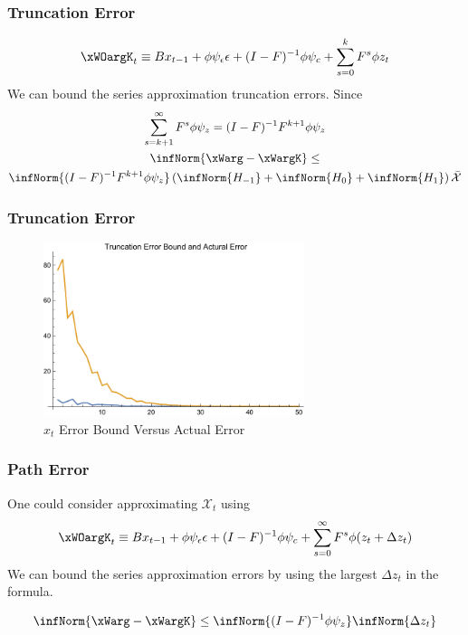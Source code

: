 \documentclass[notheorems]{beamer}
\begin{document}
\begin{frame}
  \frametitle{Truncation Error}
 	 \begin{gather}
 	 \xWOargK_t \equiv B x_{t-1}+ \phi \psi_\epsilon\epsilon  + (I - F)^{-1} \phi \psi_c + \sum_{s=0}^k F^s \phi z_{t}\label{theTruncSeries}
 \end{gather}
We can bound the  series approximation truncation errors.
Since
    \begin{gather}
      \label{eq:1}
\sum_{s=k+1}^{\infty} F^s \phi \psi_z = (I -F)^{-1} F^{k+1}\phi \psi_z       \\
\infNorm{\xWarg-\xWargK} \le\\ \infNorm{(I -F)^{-1} F^{k+1}\phi \psi_z} \left ( \infNorm{H_{-1} }+ \infNorm{H_{0} }+ \infNorm{H_{1} } \right )\bar{\mathcal{X}}
    \end{gather}

\end{frame}
\begin{frame}
  \frametitle{Truncation Error}


\begin{figure}
  \centering


\includegraphics[width=3in]{arbTruncErr.pdf}  
  \caption{$x_t$ Error Bound Versus Actual Error} \label{figArbTrunc}

\end{figure}

\end{frame}

\begin{frame}
  \frametitle{Path Error}
One could consider approximating $\mathcal{X}_t$ using
 	 \begin{gather}
 	 \xWOargK_t \equiv B x_{t-1}+ \phi \psi_\epsilon\epsilon  + (I - F)^{-1} \phi \psi_c + \sum_{s=0}^\infty F^s \phi (z_{t}+\Delta z_{t})\label{theDeltaSeries}
 \end{gather}
We can bound the  series approximation  errors by using the largest $\Delta z_t$ in the formula. 

    \begin{gather}
\infNorm{\xWarg-\xWargK} \le \infNorm{(I -F)^{-1} \phi \psi_z}  \infNorm{\Delta z_t } \label{pathErr}
    \end{gather}

\end{frame}
\end{document}
